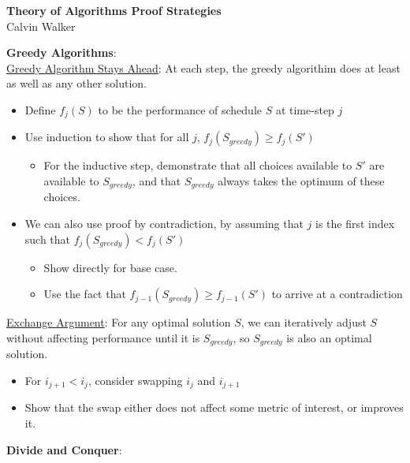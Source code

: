 \documentclass{article}
\begin{document}
\begin{center}
    \textbf{Theory of Algorithms Proof Strategies} \\[0.25ex]
    Calvin Walker
\end{center}
\textbf{Greedy Algorithms}:  \\[1.0ex]
\underline{Greedy Algorithm Stays Ahead}: At each step, the greedy algorithim does at least as well as any other solution. 
\begin{itemize}
    \item Define $f_j(S)$ to be the performance of schedule $S$ at time-step $j$
    \item Use induction to show that for all $j$, $f_j(S_{greedy}) \geq f_j(S')$ \begin{itemize}
        \item For the inductive step, demonstrate that all choices available to $S'$ are available to $S_{greedy}$, and that $S_{greedy}$ always takes the optimum of these choices. 
    \end{itemize}
    \item We can also use proof by contradiction, by assuming that $j$ is the first index such that $f_j(S_{greedy}) < f_j(S')$ \begin{itemize}
        \item Show directly for base case. 
        \item Use the fact that $f_{j - 1}(S_{greedy}) \geq f_{j - 1}(S')$ to arrive at a contradiction
    \end{itemize}
\end{itemize}
\underline{Exchange Argument}: For any optimal solution $S$, we can iteratively adjust $S$ without affecting performance until it is $S_{greedy}$, so $S_{greedy}$ is also an optimal solution. 
\begin{itemize}
    \item For $i_{j + 1} < i_j$, consider swapping $i_j$ and $i_{j + 1}$
    \item Show that the swap either does not affect some metric of interest, or improves it.
\end{itemize}
\textbf{Divide and Conquer}:
\end{document}
